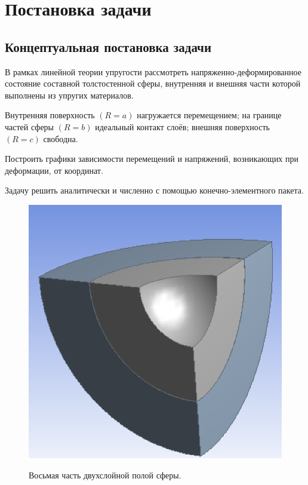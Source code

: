 \documentclass[a4paper,12pt]{article}	%
\begin{document}
\setcounter{rom_count}{1}

\Large
\section{Постановка задачи}

\subsection{Концептуальная постановка задачи}

\normalsize

В рамках линейной теории упругости рассмотреть напряженно-деформированное состояние составной толстостенной сферы, внутренняя и внешняя части которой выполнены из упругих материалов.

Внутренняя поверхность $\left(R=a\right)$ нагружается перемещением;
на границе частей сферы $\left(R=b\right)$ идеальный контакт слоёв;
внешняя поверхность $\left(R=c\right)$ свободна.

Построить графики зависимости перемещений и напряжений, возникающих при деформации, от координат.

Задачу решить аналитически и численно с помощью конечно-элементного пакета.

\begin{figure}[H]
  \centering
  \includegraphics[scale=0.7]{img/Sphere.png} \\
  \caption{Восьмая часть двухслойной полой сферы.}
  \label{fig_1}
\end{figure}
\newpage
\end{document}
